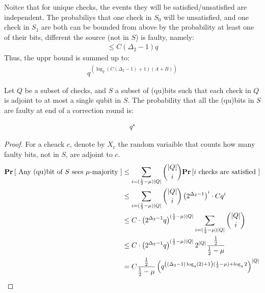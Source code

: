 \documentclass[manuscript,screen,review]{acmart}
\begin{document}
Noitce that for unique checks, the events they will be satisfied/unsatisfied are independent. The probabiliys that one check in $S_{0}$ will be unsatisfied, and one check in $S_{1}$ are both can be bounded from above by the probability at least one of their bits, different the source (not in $S$) is faulty, namely: 
\begin{equation*}
  \begin{split}
    \le C (\Delta_{2} - 1) q   
  \end{split}
\end{equation*}
Thus, the uppr bound is summed up to: 
\begin{equation*}
  \begin{split}
    q^{\left(  \log_{q} \left( C ( \Delta_{2} - 1) + 1\right) (A+B)    \right)} 
  \end{split}
\end{equation*}



\begin{claim}  
  Let $Q$ be a subset of checks, and $S$ a subset of (qu)bits such that each check in $Q$ is adjoint to at most a single qubit in $S$. The probability that all the (qu)bits in $S$ are faulty at end of a correction round is: 

  \begin{equation*}
    \begin{split}
      q^{\star}
    \end{split}
  \end{equation*}

\end{claim}

\begin{proof}
  
  For a cheack $c$, denote by $X_{c}$ the random variaible that counts how many faulty bits, not in $S$, are adjoint to $c$. 
  \begin{equation*}
    \begin{split}
      \mathbf{Pr} \left[  \text{  Any (qu)bit of }  S \text{ sees } \mu \text{-majority }  \right] & \le \sum_{i = (\frac{1}{2} - \mu ) |Q|}{{|Q| \choose  i }  \mathbf{Pr} \left[  i \text{ checks are satisfied }  \right] } \\ 
      & \le  \sum_{i = (\frac{1}{2} - \mu ) |Q|} {   {|Q| \choose  i }  \left( 2^{\Delta_{2} - 1}\right)^{i} \cdot C q^{i}  } \\ 
        & \le  C \cdot \left( 2^{\Delta_{2} - 1} q \right)^{(\frac{1}{2} - \mu ) |Q|} \sum_{i = (\frac{1}{2} - \mu ) |Q|} {   {|Q| \choose  i } }  \\ 
        & \le    C \cdot \left( 2^{\Delta_{2} - 1} q \right)^{(\frac{1}{2} - \mu ) |Q|}  2^{|Q|} \frac{\frac{1}{2}}{\frac{1}{2} - \mu} \\ 
        & = C \frac{\frac{1}{2}}{\frac{1}{2} - \mu} \left(  q^{     \left(   \left( \Delta_{2} - 1 \right) \log_{q}(2)  +   1 \right) (\frac{1}{2} - \mu ) + \log_{q}2              }    \right)^{|Q|}
    \end{split}
  \end{equation*}
\end{proof}
\end{document}
